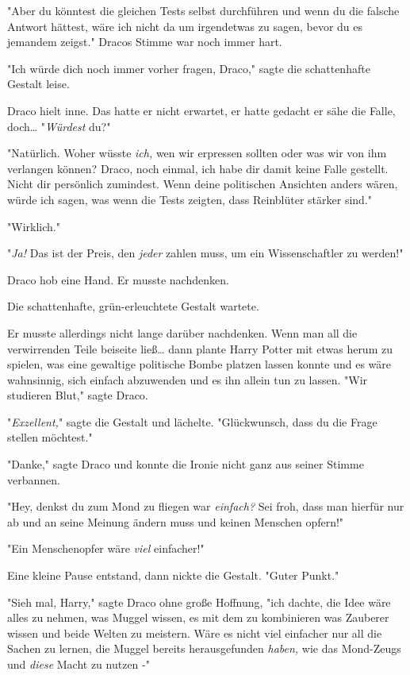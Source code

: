 {"Aber du könntest die gleichen Tests selbst durchführen und wenn du die falsche Antwort hättest, wäre ich nicht da um irgendetwas zu sagen, bevor du es jemandem zeigst." Dracos Stimme war noch immer hart.

"Ich würde dich noch immer vorher fragen, Draco," sagte die schattenhafte Gestalt leise.

Draco hielt inne. Das hatte er nicht erwartet, er hatte gedacht er sähe die Falle, doch… "\emph{Würdest} du?"

"Natürlich. Woher wüsste \emph{ich,} wen wir erpressen sollten oder was wir von ihm verlangen können? Draco, noch einmal, ich habe dir damit keine Falle gestellt. Nicht dir persönlich zumindest. Wenn deine politischen Ansichten anders wären, würde ich sagen, was wenn die Tests zeigten, dass Reinblüter stärker sind."

"Wirklich."

"\emph{Ja!} Das ist der Preis, den \emph{jeder} zahlen muss, um ein Wissenschaftler zu werden!"

Draco hob eine Hand. Er musste nachdenken.

Die schattenhafte, grün-erleuchtete Gestalt wartete.

Er musste allerdings nicht lange darüber nachdenken. Wenn man all die verwirrenden Teile beiseite ließ… dann plante Harry Potter mit etwas herum zu spielen, was eine gewaltige politische Bombe platzen lassen konnte und es wäre wahnsinnig, sich einfach abzuwenden und es ihn allein tun zu lassen. "Wir studieren Blut," sagte Draco.

"\emph{Exzellent,}" sagte die Gestalt und lächelte. "Glückwunsch, dass du die Frage stellen möchtest."

"Danke," sagte Draco und konnte die Ironie nicht ganz aus seiner Stimme verbannen.

"Hey, denkst du zum Mond zu fliegen war \emph{einfach?} Sei froh, dass man hierfür nur ab und an seine Meinung ändern muss und keinen Menschen opfern!"

"Ein Menschenopfer wäre \emph{viel} einfacher!"

Eine kleine Pause entstand, dann nickte die Gestalt. "Guter Punkt."

"Sieh mal, Harry," sagte Draco ohne große Hoffnung, "ich dachte, die Idee wäre alles zu nehmen, was Muggel wissen, es mit dem zu kombinieren was Zauberer wissen und beide Welten zu meistern. Wäre es nicht viel einfacher nur all die Sachen zu lernen, die Muggel bereits herausgefunden \emph{haben,} wie das Mond-Zeugs und \emph{diese} Macht zu nutzen -"

}

